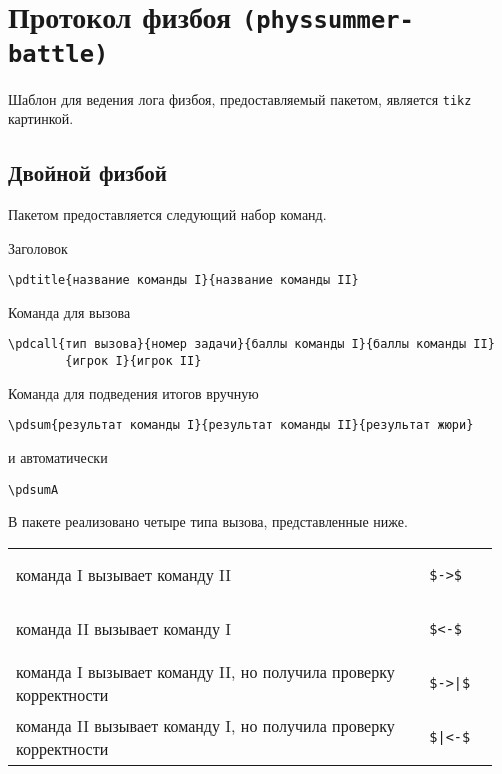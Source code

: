 \section{Протокол физбоя \texttt{(physsummer-battle)}}

Шаблон для ведения лога физбоя, предоставляемый пакетом, является \texttt{tikz} картинкой.

\subsection{Двойной физбой}

Пакетом предоставляется следующий набор команд.

Заголовок
\begin{lstlisting}[gobble = 3]
    \pdtitle{название команды I}{название команды II}
\end{lstlisting}
Команда для вызова
\begin{lstlisting}[gobble = 3]
    \pdcall{тип вызова}{номер задачи}{баллы команды I}{баллы команды II}
        {игрок I}{игрок II}
\end{lstlisting}
Команда для подведения итогов вручную
\begin{lstlisting}[gobble = 3]
    \pdsum{результат команды I}{результат команды II}{результат жюри}
\end{lstlisting}
и автоматически
\begin{lstlisting}[gobble = 3]
    \pdsumA
\end{lstlisting}



В пакете реализовано четыре типа вызова, представленные ниже.

\vspace{0.2cm}

\noindent
\begin{tabular}{S{0.82\linewidth} S{0.145\linewidth}}
    команда I вызывает команду II &
        \begin{lstlisting}[style = listtable, gobble = 7, keepspaces = \false]
            $->$
        \end{lstlisting} \\
    команда II вызывает команду I &
        \begin{lstlisting}[style = listtable, gobble = 7, keepspaces = \false]
            $<-$
        \end{lstlisting} \\
    команда I вызывает команду II, но получила проверку корректности &
        \begin{lstlisting}[style = listtable, gobble = 7, keepspaces = \false]
            $->|$
        \end{lstlisting} \\
    команда II вызывает команду I, но получила проверку корректности &
        \begin{lstlisting}[style = listtable, gobble = 7, keepspaces = \false]
            $|<-$
        \end{lstlisting}
\end{tabular}



